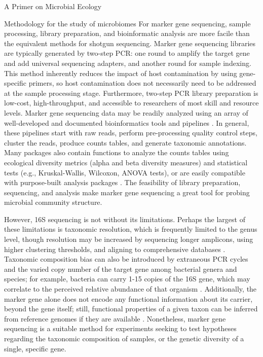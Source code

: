 \documentclass[oneside,12pt,final]{sty/ucthesis-CA2012}
\begin{document}
\begin{mainmatter}
\begin{section}{A Primer on Microbial Ecology}
\begin{subsection}{Methodology for the study of microbiomes}
For marker gene sequencing, sample processing, library preparation, and bioinformatic analysis are more facile than the equivalent methods for shotgun sequencing. Marker gene sequencing libraries are typically generated by two-step PCR: one round to amplify the target gene and add universal sequencing adapters, and another round for sample indexing. This method inherently reduces the impact of host contamination by using gene-specific primers, so host contamination does not necessarily need to be addressed at the sample processing stage. Furthermore, two-step PCR library preparation is low-cost, high-throughput, and accessible to researchers of most skill and resource levels. Marker gene sequencing data may be readily analyzed using an array of well-developed and documented bioinformatics tools and pipelines \cite{RN81, RN96, RN97}. In general, these pipelines start with raw reads, perform pre-processing quality control steps, cluster the reads, produce counts tables, and generate taxonomic annotations. Many packages also contain functions to analyze the counts tables using ecological diversity metrics (alpha and beta diversity measures) and statistical tests (e.g., Kruskal-Wallis, Wilcoxon, ANOVA tests), or are easily compatible with purpose-built analysis packages \cite{RN45}. The feasibility of library preparation, sequencing, and analysis make marker gene sequencing a great tool for probing microbial community structure. 

However, 16S sequencing is not without its limitations. Perhaps the largest of these limitations is taxonomic resolution, which is frequently limited to the genus level, though resolution may be increased by sequencing longer amplicons, using higher clustering thresholds, and aligning to comprehensive databases \cite{RN98}. Taxonomic composition bias can also be introduced by extraneous PCR cycles and the varied copy number of the target gene among bacterial genera and species; for example, bacteria can carry 1-15 copies of the 16S gene, which may correlate to the perceived relative abundance of that organism \cite{RN99}. Additionally, the marker gene alone does not encode any functional information about its carrier, beyond the gene itself; still, functional properties of a given taxon can be inferred from reference genomes if they are available \cite{RN164}. Nonetheless, marker gene sequencing is a suitable method for experiments seeking to test hypotheses regarding the taxonomic composition of samples, or the genetic diversity of a single, specific gene.


\end{subsection}
\end{section}
\end{mainmatter}
\end{document}
